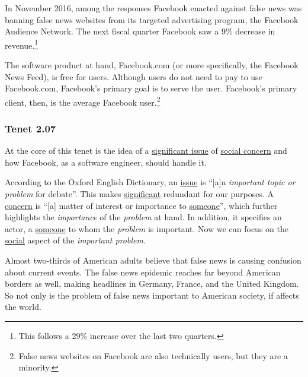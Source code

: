 \par In November 2016, among the responses Facebook enacted against false news was banning false news websites from its targeted advertising program, the Facebook Audience Network. \cite{tc_ban} The next fiscal quarter Facebook saw a 9\% decrease in revenue.\footnote{This follows a 29\% increase over the last two quarters.} \cite{tc_ban,fb_4q2016,fb_1q2017} 

\par The software product at hand, Facebook.com (or more specifically, the Facebook News Feed), is free for users. Although users do not need to pay to use Facebook.com, Facebook's primary goal is to serve the user. Facebook's primary client, then, is the average Facebook user.\footnote{False news websites on Facebook are also technically users, but they are a minority.}

\subsubsection{Tenet 2.07}


\par At the core of this tenet is the idea of a \ul{significant issue} of \ul{social concern} and how Facebook, as a software engineer, should handle it.

\par According to the Oxford English Dictionary, an \ul{issue} is ``[a]n \emph{important topic or problem} for debate''. \cite{oxford} This makes \ul{significant} redundant for our purposes. A \ul{concern} is ``[a] matter of interest or importance to \ul{someone}'', \cite{oxford} which further highlights the \emph{importance} of the \emph{problem} at hand. In addition, it specifies an actor, a \ul{someone} to whom the \emph{problem} is important. Now we can focus on the \ul{social} aspect of the \emph{important problem}.

\par Almost two-thirds of American adults believe that false news is causing confusion about current events. \cite{bbc_propaganda} The false news epidemic reaches far beyond American borders as well, making headlines in Germany, \cite{wp_germany} France, \cite{crosscheck} and the United Kingdom. \cite{guardian_steps} So not only is the problem of false news important to American society, if affects the world. 

